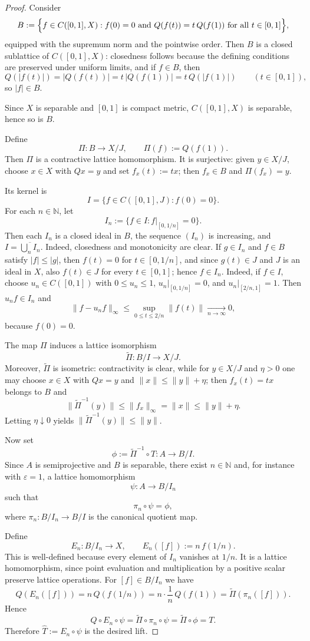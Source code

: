 \documentclass[11pt]{amsart}
\renewcommand{\le}{\leqslant}
\numberwithin{equation}{section}
\theoremstyle{definition}
\theoremstyle{remark}
\theoremstyle{plain}
\begin{document}
\begin{proof}
Consider
\[
B:=\Bigl\{f\in C([0,1],X): f(0)=0
\text{ and } Q(f(t))=t\,Q(f(1)) \text{ for all } t\in[0,1]\Bigr\},
\]
equipped with the supremum norm and the pointwise order.
Then \(B\) is a closed sublattice of \(C([0,1],X)\): closedness follows because the
defining conditions are preserved under uniform limits, and if \(f\in B\), then
\[
Q(|f(t)|)=|Q(f(t))|=t\,|Q(f(1))|=t\,Q(|f(1)|)
\qquad (t\in[0,1]),
\]
so \(|f|\in B\).

Since $X$ is separable and $[0,1]$ is compact metric, $C([0,1],X)$ is separable,
hence so is $B$.

Define
\[
\Pi\colon B\to X/J,\qquad \Pi(f):=Q(f(1)).
\]
Then $\Pi$ is a contractive lattice homomorphism.
It is surjective: given $y\in X/J$, choose $x\in X$ with $Qx=y$ and set
$f_x(t):=tx$; then $f_x\in B$ and $\Pi(f_x)=y$.

Its kernel is
\[
I=\{f\in C([0,1],J): f(0)=0\}.
\]
For each $n\in\mathbb N$, let
\[
I_n:=\{f\in I: f|_{[0,1/n]}=0\}.
\]
Then each \(I_n\) is a closed ideal in \(B\), the sequence \((I_n)\) is increasing,
and \(I=\overline{\bigcup_n I_n}\). Indeed, closedness and monotonicity are clear. If
\(g\in I_n\) and \(f\in B\) satisfy \(|f|\le |g|\), then \(f(t)=0\) for \(t\in[0,1/n]\),
and since \(g(t)\in J\) and \(J\) is an ideal in \(X\), also \(f(t)\in J\) for every
\(t\in[0,1]\); hence \(f\in I_n\).
Indeed, if $f\in I$, choose $u_n\in C([0,1])$ with
$0\le u_n\le 1$, $u_n|_{[0,1/n]}=0$, and $u_n|_{[2/n,1]}=1$.
Then $u_nf\in I_n$ and
\[
\|f-u_nf\|_\infty\le \sup_{0\le t\le 2/n}\|f(t)\|\xrightarrow[n\to\infty]{}0,
\]
because $f(0)=0$.

The map $\Pi$ induces a lattice isomorphism
\[
\widetilde\Pi\colon B/I\to X/J.
\]
Moreover, $\widetilde\Pi$ is isometric: contractivity is clear, while for
$y\in X/J$ and $\eta>0$ one may choose $x\in X$ with $Qx=y$ and
$\|x\|\le \|y\|+\eta$; then $f_x(t)=tx$ belongs to $B$ and
\[
\|\widetilde\Pi^{-1}(y)\|\le \|f_x\|_\infty=\|x\|\le \|y\|+\eta.
\]
Letting $\eta\downarrow 0$ yields $\|\widetilde\Pi^{-1}(y)\|\le \|y\|$.

Now set
\[
\phi:=\widetilde\Pi^{-1}\circ T\colon A\to B/I.
\]
Since $A$ is semiprojective and $B$ is separable, there exist $n\in\mathbb N$
and, for instance with $\varepsilon=1$, a lattice homomorphism
\[
\psi\colon A\to B/I_n
\]
such that
\[
\pi_n\circ \psi=\phi,
\]
where $\pi_n\colon B/I_n\to B/I$ is the canonical quotient map.

Define
\[
E_n\colon B/I_n\to X,\qquad E_n([f]):=n\,f(1/n).
\]
This is well-defined because every element of $I_n$ vanishes at $1/n$.
It is a lattice homomorphism, since point evaluation and multiplication by a
positive scalar preserve lattice operations.
For $[f]\in B/I_n$ we have
\[
Q(E_n([f]))
=n\,Q(f(1/n))
=n\cdot \frac1n\,Q(f(1))
=\widetilde\Pi(\pi_n([f])).
\]
Hence
\[
Q\circ E_n\circ \psi
=\widetilde\Pi\circ \pi_n\circ \psi
=\widetilde\Pi\circ \phi
=T.
\]
Therefore $\widehat T:=E_n\circ \psi$ is the desired lift.
\end{proof}
\end{document}
